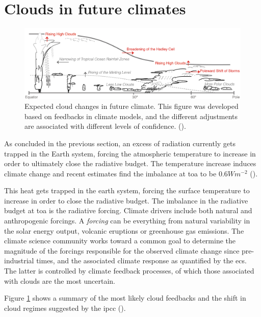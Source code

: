 \section{Clouds in future climates} \label{sec:intro_cloud_future_climates}
\begin{figure}[h]
    \centering
    \includegraphics[scale = 0.8]{Chapter1_Intro/images/Fig7-11_ipcc.jpg}
    \caption{Expected cloud changes in future climate. This figure was developed based on feedbacks in climate models, and the different adjustments are associated with different levels of confidence.  (\cite{IPCC_CH7_clouds}).}
    \label{fig:cloud_scheme}
\end{figure}
As concluded in the previous section, an excess of radiation currently gets trapped in the Earth system, forcing the atmospheric temperature to increase in order to ultimately close the radiative budget. The temperature increase induces climate change and recent estimates find the imbalance at \acrshort{toa} to be $0.6 Wm^{-2}$ (\cite{Wild2019TheModels}).

This heat gets trapped in the earth system, forcing the surface temperature to increase in order to close the radiative budget. The imbalance in the radiative budget at \acrfull{toa} is the radiative forcing. 
Climate drivers include both natural and anthropogenic forcings. A \textit{forcing} can be everything from natural variability in the solar energy output, volcanic eruptions or greenhouse gas emissions. The climate science community works toward a common goal to determine the magnitude of the forcings responsible for the observed climate change since pre-industrial times, and the associated climate response as quantified by the \acrshort{ecs}. The latter is controlled by climate feedback processes, of which those associated with clouds are the most uncertain. %

Figure \ref{fig:cloud_scheme} shows a summary of the most likely cloud feedbacks and the shift in cloud regimes suggested by the \acrshort{ipcc} (\cite{IPCC_CH7_clouds}).

